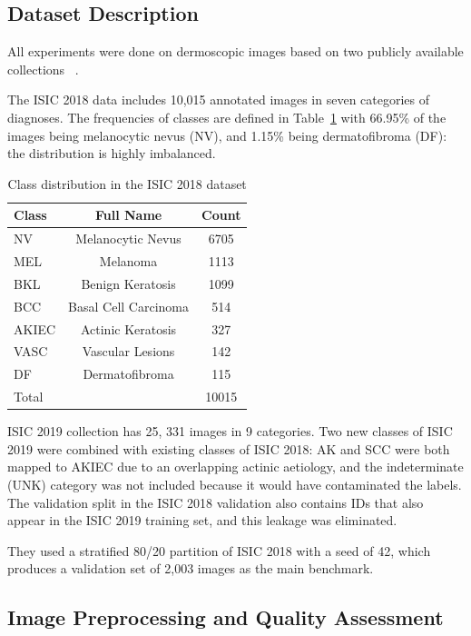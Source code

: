 \documentclass[conference]{IEEEtran}
\begin{document}
\subsection{Dataset Description}

All experiments were done on dermoscopic images based on two publicly available collections ~\cite{tschandl2018ham10000, combalia2019bcn20000}.

The ISIC 2018 data includes 10,015 annotated images in seven categories of diagnoses. The frequencies of classes are defined in Table~\ref{tab:isic2018_distribution} with 66.95\% of the images being melanocytic nevus (NV), and 1.15\% being dermatofibroma (DF): the distribution is highly imbalanced.


\begin{table}[h]
\centering
\caption{Class distribution in the ISIC 2018 dataset}
\label{tab:isic2018_distribution}
\begin{tabular}{lcc}
\hline
Class & Full Name & Count \\
\hline
NV & Melanocytic Nevus & 6705 \\
MEL & Melanoma & 1113 \\
BKL & Benign Keratosis & 1099 \\
BCC & Basal Cell Carcinoma & 514 \\
AKIEC & Actinic Keratosis & 327 \\
VASC & Vascular Lesions & 142 \\
DF & Dermatofibroma & 115 \\
\hline
Total & & 10015 \\
\hline
\end{tabular}
\end{table}

ISIC 2019 collection has 25, 331 images in 9 categories. Two new classes of ISIC 2019 were combined with existing classes of ISIC 2018: AK and SCC were both mapped to AKIEC due to an overlapping actinic aetiology, and the indeterminate (UNK) category was not included because it would have contaminated the labels. The validation split in the ISIC 2018 validation also contains IDs that also appear in the ISIC 2019 training set, and this leakage was eliminated.

They used a stratified 80/20 partition of ISIC 2018 with a seed of 42, which produces a validation set of 2,003 images as the main benchmark. 



\subsection{Image Preprocessing and Quality Assessment}
\end{document}
